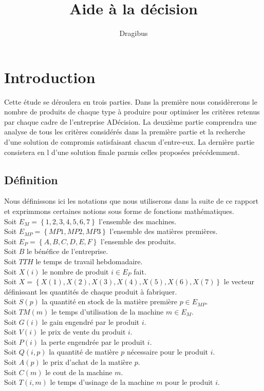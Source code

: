 \documentclass[a4paper, 11pt]{article}
\title{Aide à la décision}
\author{Dragibus}
\date{}
\begin{document}
\maketitle
\tableofcontents
\newpage

\section{Introduction}
Cette étude se déroulera en trois parties. Dans la première nous considèrerons
le nombre de produits de chaque type à produire pour optimiser les critères
retenus par chaque cadre de l'entreprise ADécision. La deuxième partie
comprendra une analyse de tous les critères considérés dans la première partie
et la recherche d'une solution de compromis satisfaisant chacun d'entre-eux. La
dernière partie consistera en l d'une solution finale parmis celles
proposées précédemment.

\subsection{Définition}
Nous définissons ici les notations que nous utiliserons dans la suite de ce
rapport et exprimmons certaines notions sous forme de fonctions mathématiques.
\\
Soit $E_M = \left\{1, 2, 3, 4, 5, 6, 7\right\} $ l'ensemble des machines. \\
Soit $E_{MP} = \left\{MP1, MP2, MP3\right\} $ l'ensemble des matières premières. \\
Soit $E_P = \left\{A, B, C, D, E, F\right\} $ l'ensemble des produits. \\
Soit $B$ le bénéfice de l'entreprise. \\
Soit $TTH$ le temps de travail hebdomadaire. \\
Soit $X(i)$ le nombre de produit $i\in E_P$ fait. \\
Soit $X = \left\{X(1), X(2), X(3), X(4), X(5), X(6), X(7)\right\}$ le vecteur
définissant les quantités de chaque produit à fabriquer.\\
Soit $S(p)$ la quantité en stock de la matière première $p\in E_{MP}$. \\
Soit $TM(m)$ le temps d'utilisation de la machine $m\in E_M$.\\
Soit $G(i)$ le gain engendré par le produit $i$. \\
Soit $V(i)$ le prix de vente du produit $i$. \\
Soit $P(i)$ la perte engendrée par le produit $i$. \\
Soit $Q(i, p)$ la quantité de matière $p$ nécessaire pour le produit $i$. \\
Soit $A(p)$ le prix d'achat de la matière $p$. \\
Soit $C(m)$ le cout de la machine $m$. \\
Soit $T(i, m)$ le temps d'usinage de la machine $m$ pour le produit $i$. \\
\end{document}
